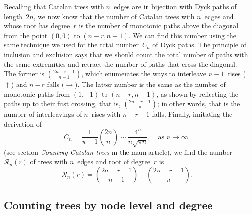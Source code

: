 \documentclass[11pt]{article}
\begin{document}
\hspace{-4pt} Recalling that Catalan trees with \(n\)~edges are in
bijection with Dyck paths of length~\(2n\), we now know that the
number of Catalan trees with \(n\)~edges and whose root has
degree~\(r\) is the number of monotonic paths above the diagonal from
the point \((0,0)\) to \((n-r,n-1)\). We can find this number using
the same technique we used for the total number~\(C_n\) of Dyck
paths. The principle of inclusion and exclusion says that we should
count the total number of paths with the same extremities and retract the
number of paths that cross the diagonal. The former is
\(\binom{2n-r-1}{n-1}\), which enumerates the ways to interleave
\(n-1\)~rises (\(\uparrow\)) and \(n-r\) falls (\(\rightarrow\)). The
latter number is the same as the number of monotonic paths from
\((1,-1)\) to \((n-r,n-1)\), as shown by reflecting the paths up to
their first crossing, that is, \(\binom{2n-r-1}{n}\); in other words,
that is the number of interleavings of \(n\)~rises with \(n-r-1\)
falls. Finally, imitating the derivation of
\begin{equation}
C_n = \frac{1}{n+1}\binom{2n}{n} \sim \frac{4^n}{n\sqrt{\pi n}},
      \quad\text{as \(n \rightarrow \infty\)}.
\label{eq:Cn}
\end{equation}
(see section \emph{Counting Catalan trees} in the main article), we
find the number \(\mathcal{R}_n(r)\) of trees with \(n\)~edges and
root of degree~\(r\) is
\begin{equation}
\mathcal{R}_n(r) = \binom{2n-r-1}{n-1} - \binom{2n-r-1}{n}.
\label{eq:R_n}
\end{equation}

\subsection{Counting trees by node level and degree}
\end{document}
